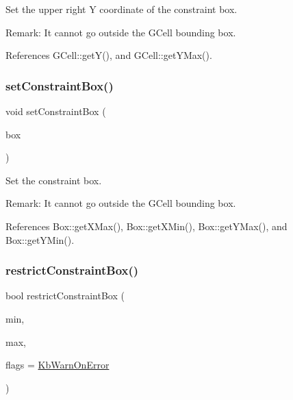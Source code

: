 Set the upper right Y coordinate of the constraint box.

\begin{DoxyParagraph}{Remark\+: It cannot go outside the G\+Cell bounding box. }

\end{DoxyParagraph}


References G\+Cell\+::get\+Y(), and G\+Cell\+::get\+Y\+Max().

\mbox{\label{classKatabatic_1_1AutoContact_a5e5f791613d0ef8f4cf9e7d8f35dc4c5}} 
\subsubsection{\texorpdfstring{set\+Constraint\+Box()}{setConstraintBox()}}
{\footnotesize\ttfamily void set\+Constraint\+Box (\begin{DoxyParamCaption}\item[{const \textbf{ Box} \&}]{box }\end{DoxyParamCaption})}

Set the constraint box.

\begin{DoxyParagraph}{Remark\+: It cannot go outside the G\+Cell bounding box. }

\end{DoxyParagraph}


References Box\+::get\+X\+Max(), Box\+::get\+X\+Min(), Box\+::get\+Y\+Max(), and Box\+::get\+Y\+Min().

\mbox{\label{classKatabatic_1_1AutoContact_ac893802d1c5518cab86f8341af817abe}} 
\subsubsection{\texorpdfstring{restrict\+Constraint\+Box()}{restrictConstraintBox()}}
{\footnotesize\ttfamily bool restrict\+Constraint\+Box (\begin{DoxyParamCaption}\item[{\textbf{ Db\+U\+::\+Unit}}]{min,  }\item[{\textbf{ Db\+U\+::\+Unit}}]{max,  }\item[{unsigned int}]{flags = {\ttfamily \mbox{\hyperlink{namespaceKatabatic_a2af2ad6b6441614038caf59d04b3b217aa5153b2cc25ebccca8616ce20ecd727a}{Kb\+Warn\+On\+Error}}} }\end{DoxyParamCaption})}


